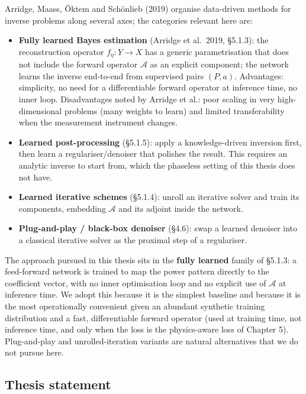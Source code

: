 \documentclass[11pt,a4paper]{report}
\begin{document}
Arridge, Maass, \"Oktem and Sch\"onlieb (2019) organise data-driven methods for
inverse problems along several axes; the categories relevant here are:
\begin{itemize}
\item \textbf{Fully learned Bayes estimation} (Arridge et al.~2019, \S5.1.3): the
reconstruction operator $f_\eta \colon Y \to X$ has a generic parametrisation that
does not include the forward operator $\mathcal A$ as an explicit component; the
network learns the inverse end-to-end from supervised pairs $(P, a)$. Advantages:
simplicity, no need for a differentiable forward operator at inference time, no
inner loop. Disadvantages noted by Arridge et al.: poor scaling in very
high-dimensional problems (many weights to learn) and limited transferability when
the measurement instrument changes.
\item \textbf{Learned post-processing} (\S5.1.5): apply a knowledge-driven inversion
first, then learn a regulariser/denoiser that polishes the result. This requires an
analytic inverse to start from, which the phaseless setting of this thesis does not
have.
\item \textbf{Learned iterative schemes} (\S5.1.4): unroll an iterative solver and
train its components, embedding $\mathcal A$ and its adjoint inside the network.
\item \textbf{Plug-and-play / black-box denoiser} (\S4.6): swap a learned denoiser
into a classical iterative solver as the proximal step of a regulariser.
\end{itemize}
The approach pursued in this thesis sits in the \textbf{fully learned} family of
\S5.1.3: a feed-forward network is trained to map the power pattern directly to
the coefficient vector, with no inner optimisation loop and no explicit use of
$\mathcal A$ at inference time. We adopt this because it is the simplest baseline
and because it is the most operationally convenient given an abundant synthetic
training distribution and a fast, differentiable forward operator (used at training
time, not inference time, and only when the loss is the physics-aware loss of
Chapter 5). Plug-and-play and unrolled-iteration variants are natural alternatives
that we do not pursue here.

\subsection*{Thesis statement}
\end{document}
